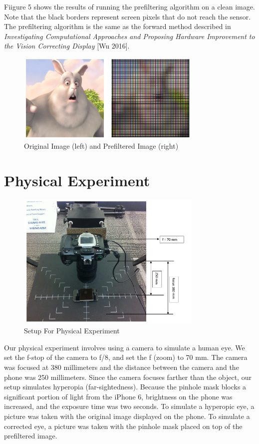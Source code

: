 \documentclass{acmsiggraph}
\begin{document}
Fiigure 5 shows the results of running the prefiltering algorithm on a clean image. Note that the black borders represent screen pixels that do not reach the sensor. The prefiltering algorithm is the same as the forward method described in \textit{Investigating Computational Approaches and Proposing Hardware Improvement to the Vision Correcting Display} [Wu 2016].

\begin{figure}[ht]
  \centering
  \includegraphics[width=3.5in]{Original_Prefiltered.png}
  \caption{Original Image (left) and Prefiltered Image (right)}
  \label{fig:fr}
\end{figure}

\section{Physical Experiment}

\begin{figure}[ht]
  \centering
  \includegraphics[width=3.5in]{Setup.png}
  \caption{Setup For Physical Experiment}
  \label{fig:ferrari}
\end{figure}

Our physical experiment involves using a camera to simulate a human eye. We set the f-stop of the camera to f/8, and set the f (zoom) to 70 mm. The camera was focused at 380 millimeters and the distance between the camera and the phone was 250 millimeters. Since the camera focuses farther than the object, our setup simulates hyperopia (far-sightedness). Because the pinhole mask blocks a significant portion of light from the iPhone 6, brightness on the phone was increased, and the exposure time was two seconds. To simulate a hyperopic eye, a picture was taken with the original image displayed on the phone. To simulate a corrected eye, a picture was taken with the pinhole mask placed on top of the prefiltered image. 
\end{document}
